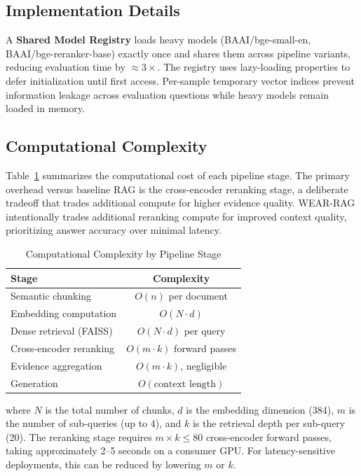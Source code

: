 \documentclass[conference]{IEEEtran}
\begin{document}
\subsection{Implementation Details}

A \textbf{Shared Model Registry} loads heavy models (BAAI/bge-small-en, BAAI/bge-reranker-base) exactly once and shares them across pipeline variants, reducing evaluation time by $\approx 3\times$. The registry uses lazy-loading properties to defer initialization until first access. Per-sample temporary vector indices prevent information leakage across evaluation questions while heavy models remain loaded in memory.

\subsection{Computational Complexity}

Table~\ref{tab:complexity} summarizes the computational cost of each pipeline stage. The primary overhead versus baseline RAG is the cross-encoder reranking stage, a deliberate tradeoff that trades additional compute for higher evidence quality. WEAR-RAG intentionally trades additional reranking compute for improved context quality, prioritizing answer accuracy over minimal latency.

\begin{table}[!ht]
\centering
\caption{Computational Complexity by Pipeline Stage}
\label{tab:complexity}
\footnotesize
\begin{tabular}{lc}
\toprule
\textbf{Stage} & \textbf{Complexity} \\
\midrule
Semantic chunking & $O(n)$ per document \\
Embedding computation & $O(N \cdot d)$ \\
Dense retrieval (FAISS) & $O(N \cdot d)$ per query \\
Cross-encoder reranking & $O(m \cdot k)$ forward passes \\
Evidence aggregation & $O(m \cdot k)$, negligible \\
Generation & $O(\text{context length})$ \\
\bottomrule
\end{tabular}
\end{table}

where $N$ is the total number of chunks, $d$ is the embedding dimension (384), $m$ is the number of sub-queries (up to 4), and $k$ is the retrieval depth per sub-query (20). The reranking stage requires $m \times k \leq 80$ cross-encoder forward passes, taking approximately 2--5 seconds on a consumer GPU. For latency-sensitive deployments, this can be reduced by lowering $m$ or $k$.
\end{document}
